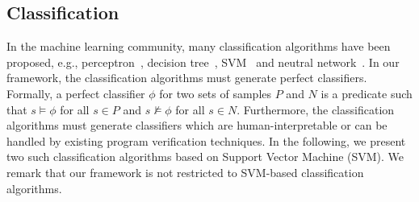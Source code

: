 \subsection{Classification}
In the machine learning community, many classification algorithms have been proposed, e.g., perceptron~\cite{perceptron}, decision tree~\cite{quinlan1986induction}, SVM~\cite{svm:original} and neutral network~\cite{nn}.
In our framework, the classification algorithms must generate perfect classifiers. Formally, a perfect classifier $\phi$ for two sets of samples $P$ and $N$ is a predicate such that $s \models \phi$ for all $s \in P$ and $s \not \models \phi$ for all $s \in N$. Furthermore, the classification algorithms must generate classifiers which are human-interpretable or can be handled by existing program verification techniques. In the following, we present two such classification algorithms based on Support Vector Machine (SVM). We remark that our framework is not restricted to SVM-based classification algorithms.
